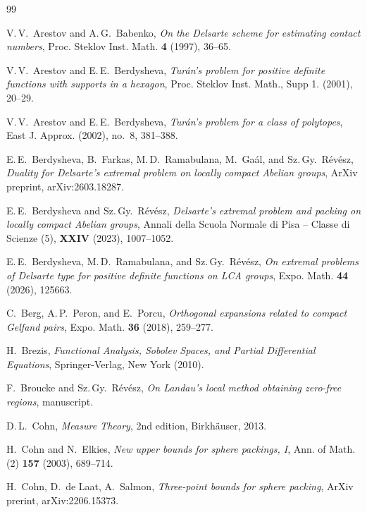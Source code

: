 \documentclass[[a4paper,english,12pt]{amsart}
\theoremstyle{plain}
\theoremstyle{remark}
\begin{document}

\begin{thebibliography}{99}

V.\,V.~Arestov and A.\,G.~Babenko, \emph{On the Delsarte scheme for estimating contact numbers},
Proc. Steklov Inst. Math. \textbf{4} (1997), 36--65.

V.\,V.~Arestov and E.\,E.~Berdysheva, \emph{Tur\'an's problem for positive definite functions with supports in a hexagon}, Proc. Steklov Inst. Math., Supp 1. (2001), 20--29.

V.\,V.~Arestov and E.\,E.~Berdysheva, \emph{Tur\'an's problem for a class of polytopes}, East J. Approx. (2002), no.~8, 381--388.

E.\,E.~Berdysheva, B.~Farkas, M.\,D.~Ramabulana, M.~Ga\'al, and Sz.\,Gy.~R\'ev\'esz, \emph{Duality for Delsarte's extremal problem on locally compact Abelian groups}, ArXiv preprint, arXiv:2603.18287.

E.\,E.~Berdysheva and Sz.\,Gy.~R\'ev\'esz,
\emph{Delsarte's extremal problem and packing on locally compact Abelian groups},  Annali della Scuola Normale di Pisa – Classe di Scienze (5), {\bf XXIV} (2023), 1007--1052. 

E.\,E.~Berdysheva, M.\,D.~Ramabulana, and Sz.\,Gy.~Révész, \emph{On extremal problems of Delsarte type for positive definite functions on LCA groups}, Expo. Math. {\bf 44} (2026), 125663.

C.~Berg, A.\,P.~Peron, and E.~Porcu, \emph{Orthogonal expansions related to compact Gelfand pairs}, Expo. Math. {\bf 36} (2018), 259--277.

H.~Brezis, \emph{Functional Analysis, Sobolev Spaces, and Partial Differential Equations}, Springer-Verlag, New York (2010).

F.~Broucke and Sz.\,Gy.~Révész, \emph{On Landau's local method obtaining zero-free regions}, manuscript.


D.\,L.~Cohn, \emph{Measure Theory}, 2nd edition, Birkh\"auser, 2013.

H.~Cohn and N.~Elkies, \emph{New upper bounds for sphere packings, I}, Ann. of Math. (2) \textbf{157} (2003), 689--714.

H.~Cohn, D.~de Laat, A.~Salmon, \emph{Three-point bounds for sphere packing},  ArXiv prerint, arXiv:2206.15373.


\end{thebibliography}
\end{document}
